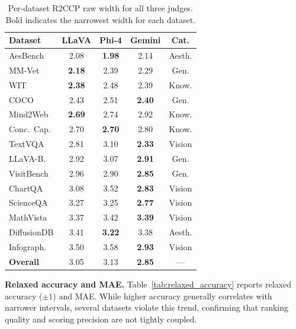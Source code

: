 \documentclass{article}
\begin{document}
\begin{table}[t]
\centering
\caption{Per-dataset R2CCP raw width for all three judges. Bold indicates the narrowest width for each dataset.}
\label{tab:all_judges_per_dataset}
\small
\begin{tabular}{lcccc}
\toprule
\textbf{Dataset} & \textbf{LLaVA} & \textbf{Phi-4} & \textbf{Gemini} & \textbf{Cat.} \\
\midrule
AesBench & 2.08 & \textbf{1.98} & 2.14 & Aesth. \\
MM-Vet & \textbf{2.18} & 2.39 & 2.29 & Gen. \\
WIT & \textbf{2.38} & 2.48 & 2.39 & Know. \\
COCO & 2.43 & 2.51 & \textbf{2.40} & Gen. \\
Mind2Web & \textbf{2.69} & 2.74 & 2.92 & Know. \\
Conc.\ Cap. & 2.70 & \textbf{2.70} & 2.80 & Know. \\
TextVQA & 2.81 & 3.10 & \textbf{2.33} & Vision \\
LLaVA-B. & 2.92 & 3.07 & \textbf{2.91} & Gen. \\
VisitBench & 2.96 & 2.90 & \textbf{2.85} & Gen. \\
ChartQA & 3.08 & 3.52 & \textbf{2.83} & Vision \\
ScienceQA & 3.27 & 3.25 & \textbf{2.77} & Vision \\
MathVista & 3.37 & 3.42 & \textbf{3.39} & Vision \\
DiffusionDB & 3.41 & \textbf{3.22} & 3.38 & Aesth. \\
Infograph. & 3.50 & 3.58 & \textbf{2.93} & Vision \\
\midrule
\textbf{Overall} & 3.05 & 3.13 & \textbf{2.85} & --- \\
\bottomrule
\end{tabular}
\end{table}

\textbf{Relaxed accuracy and MAE.}
Table~\ref{tab:relaxed_accuracy} reports relaxed accuracy ($\pm 1$) and MAE. While higher accuracy generally correlates with narrower intervals, several datasets violate this trend, confirming that ranking quality and scoring precision are not tightly coupled.
\end{document}
